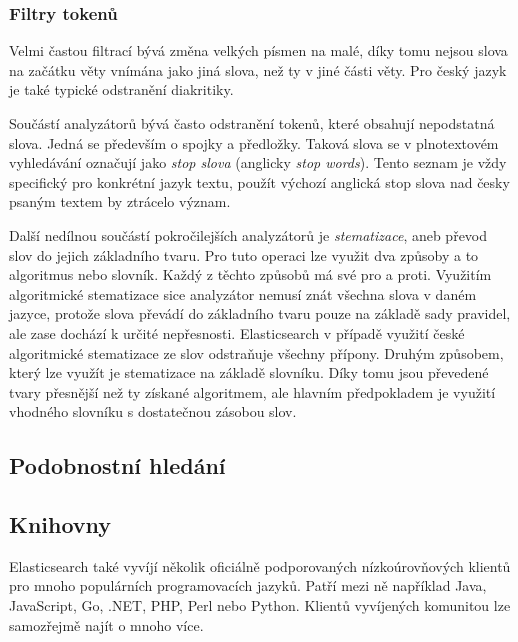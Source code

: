 \subsubsection*{Filtry tokenů}

Velmi častou filtrací bývá změna velkých písmen na malé, díky tomu nejsou slova na začátku věty vnímána jako jiná slova, než ty v jiné části věty. Pro český jazyk je také typické odstranění diakritiky.

Součástí analyzátorů bývá často odstranění tokenů, které obsahují nepodstatná slova. Jedná se především o spojky a předložky. Taková slova se v plnotextovém vyhledávání označují jako \emph{stop slova} (anglicky \emph{stop words}). Tento seznam je vždy specifický pro konkrétní jazyk textu, použít výchozí anglická stop slova nad česky psaným textem by ztrácelo význam.

Další nedílnou součástí pokročilejších analyzátorů je \emph{stematizace}, aneb převod slov do jejich základního tvaru. Pro tuto operaci lze využit dva způsoby a to algoritmus nebo slovník. Každý z těchto způsobů má své pro a proti.
Využitím algoritmické stematizace sice analyzátor nemusí znát všechna slova v daném jazyce, protože slova převádí do základního tvaru pouze na základě sady pravidel, ale zase dochází k určité nepřesnosti. Elasticsearch v případě využití české algoritmické stematizace ze slov odstraňuje všechny přípony.
Druhým způsobem, který lze využít je stematizace na základě slovníku. Díky tomu jsou převedené tvary přesnější než ty získané algoritmem, ale hlavním předpokladem je využití vhodného slovníku s dostatečnou zásobou slov.

\subsection{Podobnostní hledání}
\blindtext[2]

\subsection{Knihovny}
Elasticsearch také vyvíjí několik oficiálně podporovaných nízkoúrovňových klientů pro mnoho populárních programovacích jazyků. Patří mezi ně například Java, JavaScript, Go, .NET, PHP, Perl nebo Python. 
Klientů vyvíjených komunitou lze samozřejmě najít o mnoho více. %

